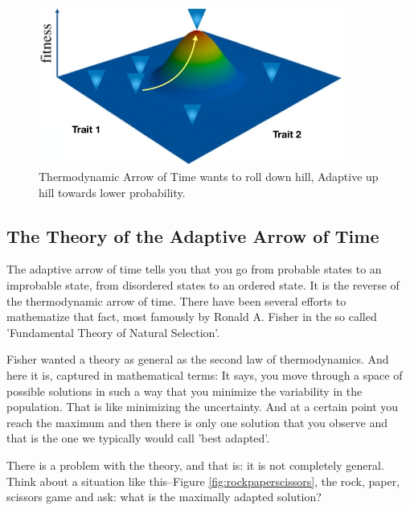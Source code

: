 \documentclass[]{article}
\begin{document}
\begin{figure}[H]
	\caption[Thermodynamic Arrow of Time versus Adaptive ]{Thermodynamic Arrow of Time wants to roll down hill, Adaptive up hill towards lower probability.}\label{fig:NaturalSelection}
	\includegraphics[width=0.9\textwidth]{NaturalSelection}
\end{figure}

\subsection{The Theory of the Adaptive Arrow of Time}\label{section:adaptive}

The adaptive arrow of time tells you that you go
from probable states to an improbable state,
from disordered states to an ordered state.
It is the reverse of the thermodynamic arrow of time.
There have been several efforts to mathematize that fact,
most famously by Ronald A. Fisher
in the so called 'Fundamental Theory of Natural Selection'.

Fisher wanted a theory as general as the second law of thermodynamics.
And here it is, captured in mathematical terms:
It says, you move through a space of possible solutions
in such a way that you minimize the variability in the population.
That is like minimizing the uncertainty.
And at a certain point you reach the maximum
and then there is only one solution that you observe
and that is the one we typically would call 'best adapted'.

There is a problem with the theory,
and that is: it is not completely general.
Think about a situation like this--Figure \ref{fig:rockpaperscissors},
the rock, paper, scissors game
and ask: what is the maximally adapted solution?
\end{document}
